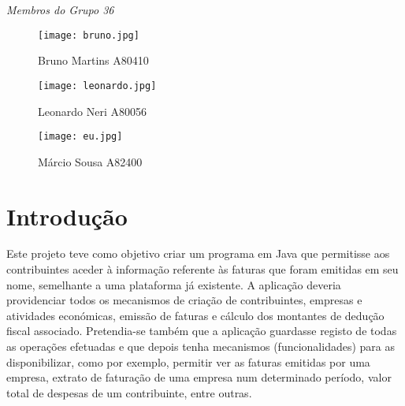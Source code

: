 \begin{titlepage}
\Large \emph{Membros do Grupo 36}\\


\begin{figure}[!htb]
  \texttt{[image: bruno.jpg]}
  \caption{Bruno Martins A80410}
\endminipage\hfill
{}
  \texttt{[image: leonardo.jpg]}
  \caption{Leonardo Neri A80056}
\endminipage\hfill
{}%
  \texttt{[image: eu.jpg]}
  \caption{Márcio Sousa A82400}
\endminipage
\end{figure}


 

\vfill %

\end{titlepage}

\section{Introdução}
Este projeto teve como objetivo criar um programa em Java que permitisse aos contribuintes aceder à informação referente às faturas que foram emitidas em seu nome, semelhante a uma plataforma já existente. A aplicação deveria providenciar todos os mecanismos de criação de contribuintes, empresas e atividades económicas, emissão de faturas e cálculo dos montantes de
dedução fiscal associado. Pretendia-se também que a aplicação guardasse registo de todas as operações efetuadas e que depois tenha mecanismos (funcionalidades) para as disponibilizar, como por exemplo, permitir ver as faturas emitidas por uma empresa, extrato de faturação de uma empresa num determinado período, valor total de despesas de um contribuinte, entre outras.

